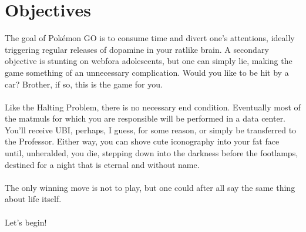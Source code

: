 \chapter{Objectives\label{sec:goal}}
The goal of Pokémon GO is to consume time and divert one's attentions,
  ideally triggering regular releases of dopamine in your ratlike brain.
A secondary objective is stunting on webfora adolescents, but one
  can simply lie, making the game something of an unnecessary complication.
Would you like to be hit by a car? Brother, if so, this is the game for you.\\
\\
Like the Halting Problem, there is no necessary end condition.
Eventually most of the matmuls for which you are responsible will be performed in a data center.
You'll receive UBI, perhaps, I guess, for some reason, or simply be transferred to the Professor.
Either way, you can shove cute iconography into your fat face until, unheralded, you die,
stepping down into the darkness before the footlamps, destined for a night that is
eternal and without name.\\
\\
The only winning move is not to play, but one could after all say the same
  thing about life itself.\\
\\
Let's begin!
